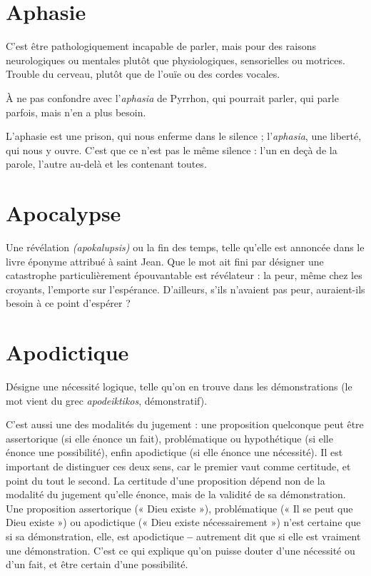 \section{Aphasie}
C’est être pathologiquement incapable de parler, mais pour des
raisons neurologiques ou mentales plutôt que physiologiques,
sensorielles ou motrices. Trouble du cerveau, plutôt que de l’ouïe ou des cordes
vocales.

À ne pas confondre avec l’{\it aphasia} de Pyrrhon, qui pourrait parler, qui parle
parfois, mais n’en a plus besoin.

L’aphasie est une prison, qui nous enferme dans le silence ; l’{\it aphasia}, une
liberté, qui nous y ouvre. C’est que ce n’est pas le même silence : l’un en deçà
de la parole, l’autre au-delà et les contenant toutes.

\section{Apocalypse}
Une révélation {\it (apokalupsis)} ou la fin des temps, telle qu’elle
est annoncée dans le livre éponyme attribué à saint Jean. Que
le mot ait fini par désigner une catastrophe particulièrement épouvantable est
révélateur : la peur, même chez les croyants, l'emporte sur l’espérance.
D'ailleurs, s’ils n'avaient pas peur, auraient-ils besoin à ce point d’espérer ?

\section{Apodictique}
Désigne une nécessité logique, telle qu’on en trouve dans
les démonstrations (le mot vient du grec {\it apodeiktikos},
démonstratif).

C'est aussi une des modalités du jugement : une proposition quelconque
peut être assertorique (si elle énonce un fait), problématique ou hypothétique
(si elle énonce une possibilité), enfin apodictique (si elle énonce une nécessité).
Il est important de distinguer ces deux sens, car le premier vaut comme certitude,
et point du tout le second. La certitude d’une proposition dépend non de
la modalité du jugement qu’elle énonce, mais de la validité de sa démonstration.
Une proposition assertorique (« Dieu existe »), problématique (« Il se peut
que Dieu existe ») ou apodictique (« Dieu existe nécessairement ») n’est certaine
que si sa démonstration, elle, est apodictique {\bf --} autrement dit que si elle
est vraiment une démonstration. C’est ce qui explique qu’on puisse douter
d’une nécessité ou d’un fait, et être certain d’une possibilité.

